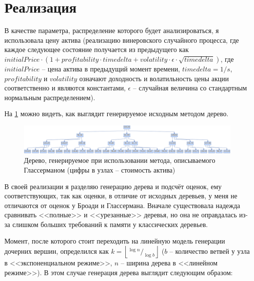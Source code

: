 \documentclass[12pt,twoside,titlepage,сa4paper]{article}
\begin{document}
\section{Реализация}
	\par В качестве параметра, распределение которого будет анализироваться, я использовала цену актива (реализацию винеровского случайного процесса, где каждое следующее состояние получается из предыдущего как $initialPrice \cdot (1 + profitability\cdot timedelta + volatility \cdot \epsilon \cdot \sqrt{timedelta})$, где $initialPrice$ -- цена актива в предыдущий момент времени, $timedelta = 1/s$, $profitability$ и $volatility$ означают доходность и волатильность цены акции соответственно и являются константами, $\epsilon$ -- случайная величина со стандартным нормальным распределением).
	\par На \ref{fig:exponentialTree} можно видеть, как выглядит генерируемое исходным методом дерево.
	\begin{figure}[h]
		\includegraphics[width=\textwidth]{exp_tree}
		\caption{Дерево, генерируемое при использовании метода, описываемого Глассерманом (цифры в узлах -- стоимость актива)}
		\label{fig:exponentialTree}
	\end{figure}
	\par В своей реализации я разделяю генерацию дерева и подсчёт оценок, ему соответствующих, так как оценки, в отличие от исходных деревьев, у меня не отличаются от оценок у Броади и Глассермана. Вначале существовала надежда сравнивать <<полные>> и <<урезанные>> деревья, но она не оправдалась из-за слишком больших требований к памяти у классических деревьев.
	\par Момент, после которого стоит переходить на линейную модель генерации дочерних вершин, определился как $k = \left\lfloor ^{\log n} / _{\log b}\right\rfloor$ ($b$ -- количество ветвей у узла в <<экспоненциальном режиме>>, $n$ -- ширина дерева в <<линейном режиме>>). В этом случае генерация дерева выглядит следующим образом:
\end{document}
